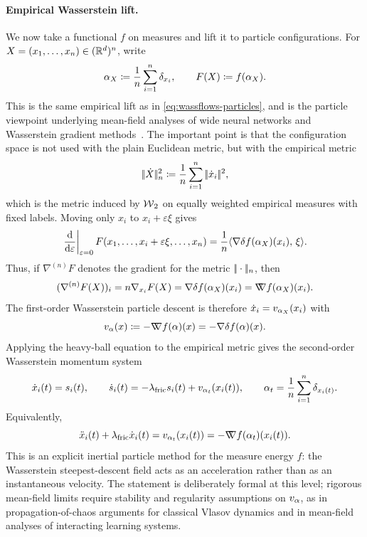 \paragraph{Empirical Wasserstein lift.}
We now take a functional $f$ on measures and lift it to particle configurations. For $X=(x_1,\ldots,x_n)\in(\mathbb{R}^d)^n$, write
\begin{equation}\label{eq-empirical-momentum-lift}
	\alpha_X \coloneqq \frac1n\sum_{i=1}^n \delta_{x_i},
	\qquad
	F(X) \coloneqq f(\alpha_X).
\end{equation}
This is the same empirical lift as in \eqref{eq:wassflows-particles}, and is the particle viewpoint underlying mean-field analyses of wide neural networks and Wasserstein gradient methods~\cite{ChizatBach2018OverparameterizedOT,MeiMontanariNguyen2018MeanFieldNN,RotskoffVandenEijnden2018Trainability}. The important point is that the configuration space is not used with the plain Euclidean metric, but with the empirical metric
\[
	|\!| \dot X |\!|_n^2
	\coloneqq
	\frac1n\sum_{i=1}^n|\!| \dot x_i |\!|^2,
\]
which is the metric induced by $\operatorname{\mathcal{W}}_2$ on equally weighted empirical measures with fixed labels. Moving only $x_i$ to $x_i+\varepsilon \xi$ gives
\[
	\left.\frac{\mathrm{d}}{\mathrm{d}\varepsilon}\right|_{\varepsilon=0}
	F(x_1,\ldots,x_i+\varepsilon\xi,\ldots,x_n)
	=
	\frac1n\langle \nabla\delta f(\alpha_X)(x_i),\,\xi\rangle.
\]
Thus, if $\nabla^{(n)}F$ denotes the gradient for the metric $|\!| \cdot |\!|_n$, then
\begin{equation}\label{eq-empirical-lift-gradient}
	(\nabla^{(n)}F(X))_i
	=
	n\nabla_{x_i}F(X)
	=
	\nabla\delta f(\alpha_X)(x_i)
	=
	\mathord{\nabla\mkern-9.3mu\nabla} f(\alpha_X)(x_i).
\end{equation}
The first-order Wasserstein particle descent is therefore $\dot x_i=v_{\alpha_X}(x_i)$ with
\begin{equation}\label{eq-momentum-wasserstein-velocity}
	v_\alpha(x)\coloneqq -\mathord{\nabla\mkern-9.3mu\nabla} f(\alpha)(x)=-\nabla\delta f(\alpha)(x).
\end{equation}
Applying the heavy-ball equation to the empirical metric gives the second-order Wasserstein momentum system
\begin{equation}\label{eq-wasserstein-momentum-particles}
	\dot x_i(t)=s_i(t),
	\qquad
	\dot s_i(t)=-\lambda_{\rm fric} s_i(t)+v_{\alpha_t}(x_i(t)),
	\qquad
	\alpha_t=\frac1n\sum_{i=1}^n\delta_{x_i(t)}.
\end{equation}
Equivalently,
\[
	\ddot x_i(t)+\lambda_{\rm fric}\dot x_i(t)
	=
	v_{\alpha_t}(x_i(t))
	=
	-\mathord{\nabla\mkern-9.3mu\nabla} f(\alpha_t)(x_i(t)).
\]
This is an explicit inertial particle method for the measure energy $f$: the Wasserstein steepest-descent field acts as an acceleration rather than as an instantaneous velocity. The statement is deliberately formal at this level; rigorous mean-field limits require stability and regularity assumptions on $v_\alpha$, as in propagation-of-chaos arguments for classical Vlasov dynamics and in mean-field analyses of interacting learning systems.

